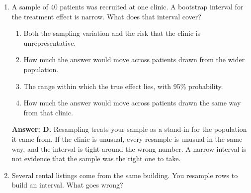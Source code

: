 \documentclass[11pt]{article}
\begin{document}
\begin{enumerate}[itemsep=14pt]
\begin{enumerate}[label=\Alph*., itemsep=1pt, topsep=3pt]
  \item That the bootstrap was unnecessary and the formula should be used instead.
  \item That the sample is large enough for the coefficient to be normally distributed.
  \item That the resampling is working, which is the reason to trust it where no formula exists.
  \item That the model's assumptions have been checked and hold.
\end{enumerate}

\vspace{2pt}
\textbf{Answer: C.} Agreement on a case you can check is the argument for using the method on a median, a ratio, or an importance score, where there is nothing to check it against. It is a calibration, not a redundancy.
\vspace{4pt}

\item A sample of 40 patients was recruited at one clinic. A bootstrap interval for the treatment effect is narrow. What does that interval cover?

\begin{enumerate}[label=\Alph*., itemsep=1pt, topsep=3pt]
  \item Both the sampling variation and the risk that the clinic is unrepresentative.
  \item How much the answer would move across patients drawn from the wider population.
  \item The range within which the true effect lies, with 95\% probability.
  \item How much the answer would move across patients drawn the same way from that clinic.
\end{enumerate}

\vspace{2pt}
\textbf{Answer: D.} Resampling treats your sample as a stand-in for the population it came from. If the clinic is unusual, every resample is unusual in the same way, and the interval is tight around the wrong number. A narrow interval is not evidence that the sample was the right one to take.
\vspace{4pt}

\item Several rental listings come from the same building. You resample rows to build an interval. What goes wrong?


\end{enumerate}
\end{document}
